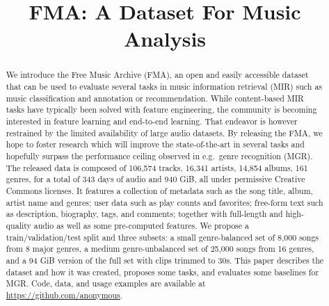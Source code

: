 \documentclass{article}
\title{FMA: A Dataset For Music Analysis}
\newcommand{\ntracks}{106,574 }
\newcommand{\nartists}{16,341 }
\newcommand{\nalbums}{14,854 }
\newcommand{\ngenres}{161 }
\newcommand{\tduration}{343 }
\newcommand{\size}{940 }
\begin{document}
\maketitle

\begin{abstract}
We introduce the Free Music Archive (FMA), an open and easily accessible dataset that can be used to evaluate several tasks in music information retrieval (MIR) such as music classification and annotation or recommendation.
While content-based MIR tasks have typically been solved with feature engineering,
the community is becoming interested in feature learning and end-to-end learning. %
That endeavor is however restrained by the limited availability of large audio datasets.
By releasing the FMA, we hope to foster research which will improve the state-of-the-art in several tasks and hopefully surpass the performance ceiling observed in e.g.\ genre recognition (MGR).
The released data is composed of \ntracks tracks, \nartists artists, \nalbums albums, \ngenres genres, for a total of \tduration days of audio and \size GiB, all under permissive Creative Commons licenses.
It features a collection of metadata such as the song title, album, artist name and genres; user data such as play counts and favorites; free-form text such as description, biography, tags, and comments; together with full-length and high-quality audio as well as some pre-computed features. We propose a train/validation/test split and three subsets: a small genre-balanced set of 8,000 songs from 8 major genres, a medium genre-unbalanced set of 25,000 songs from 16 genres, and a 94 GiB version of the full set with clips trimmed to 30s.
This paper describes the dataset and how it was created, proposes some tasks, and evaluates some baselines for MGR.
Code, data, and usage examples are available at \url{https://github.com/anonymous}.


\end{abstract}
\end{document}
